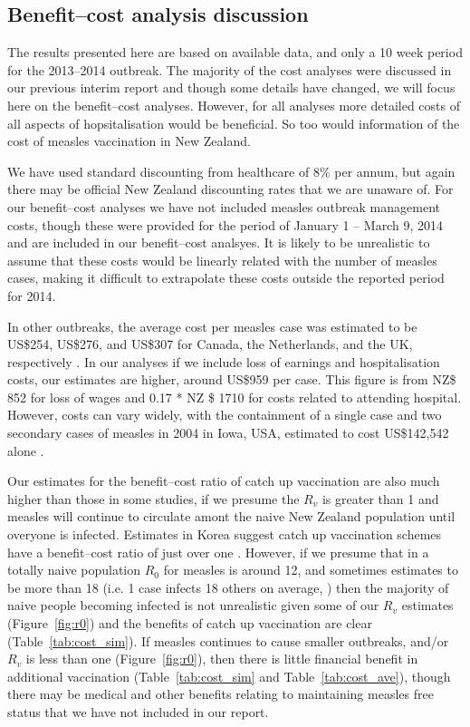 \documentclass{article}
\begin{document}
\subsection{Benefit--cost analysis discussion}
The results presented here are based on available data, and only a 10 week period for the 2013--2014 outbreak. The majority of the cost analyses were discussed in our previous interim report and though some details have changed, we will focus here on the benefit--cost analyses. However, for all analyses more detailed costs of all aspects of hopsitalisation would be beneficial. So too would information of the cost of measles vaccination in New Zealand.

We have used standard discounting from healthcare of 8\% per annum, but again there may be official New Zealand discounting rates that we are unaware of.
For our benefit--cost analyses we have not included measles outbreak management costs, though these were provided for the period of January 1 -- March 9, 2014 and are included in our benefit--cost analsyes. It is likely to be unrealistic to assume that these costs would be linearly related with the number of measles cases, making it difficult to extrapolate these costs outside the reported period for 2014.

In other outbreaks, the average cost per measles case was estimated to be US\$254, US\$276, and US\$307 for Canada, the Netherlands, and the UK, respectively \citep{carabin2}. In our analyses if we include loss of earnings and hospitalisation costs, our estimates are higher, around US\$959 per case. This figure is from NZ\$ 852 for loss of wages and 0.17 * NZ \$ 1710 for costs related to attending hospital. However, costs can vary widely, with the containment of a single case and two secondary cases of measles in 2004 in Iowa, USA, estimated to cost US\$142,542 alone \citep{dayan5}.

Our estimates for the benefit--cost ratio of catch up vaccination are also much higher than those in some studies, if we presume the $R_v$ is greater than 1 and measles will continue to circulate amont the naive New Zealand population until overyone is infected. Estimates in Korea suggest catch up vaccination schemes have a benefit--cost ratio of just over one \citep{bae13}. However, if we presume that in a totally naive population $R_0$ for measles is around 12, and sometimes estimates to be more than 18 (i.e. 1 case infects 18 others on average, \citep{anderson91}) then the majority of naive people becoming infected is not unrealistic given some of our $R_v$ estimates (Figure~\ref{fig:r0}) and the benefits of catch up vaccination are clear (Table~\ref{tab:cost_sim}). If measles continues to cause smaller outbreaks, and/or $R_v$ is less than one (Figure~\ref{fig:r0}), then there is little financial benefit in additional vaccination (Table~\ref{tab:cost_sim} and Table~\ref{tab:cost_ave}), though there may be medical and other benefits relating to maintaining measles free status that we have not included in our report.
\end{document}
